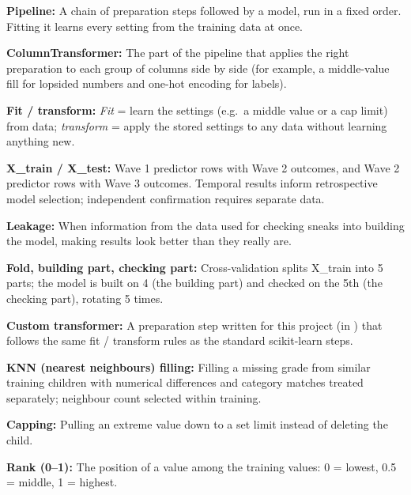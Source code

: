 \documentclass[conference,a4paper]{IEEEtran}
\begin{document}
{\small
\noindent\textbf{Pipeline:} A chain of preparation steps followed by a model, run in a fixed order. Fitting it learns every setting from the training data at once.\par\vspace{2pt}
\noindent\textbf{ColumnTransformer:} The part of the pipeline that applies the right preparation to each group of columns side by side (for example, a middle-value fill for lopsided numbers and one-hot encoding for labels).\par\vspace{2pt}
\noindent\textbf{Fit / transform:} \emph{Fit} = learn the settings (e.g.\ a middle value or a cap limit) from data; \emph{transform} = apply the stored settings to any data without learning anything new.\par\vspace{2pt}
\noindent\textbf{X\_train / X\_test:} Wave 1 predictor rows with Wave 2 outcomes, and Wave 2 predictor rows with Wave 3 outcomes. Temporal results inform retrospective model selection; independent confirmation requires separate data.\par\vspace{2pt}
\noindent\textbf{Leakage:} When information from the data used for checking sneaks into building the model, making results look better than they really are.\par\vspace{2pt}
\noindent\textbf{Fold, building part, checking part:} Cross-validation splits X\_train into 5 parts; the model is built on 4 (the building part) and checked on the 5th (the checking part), rotating 5 times.\par\vspace{2pt}
\noindent\textbf{Custom transformer:} A preparation step written for this project (in ) that follows the same fit / transform rules as the standard scikit-learn steps.\par\vspace{2pt}
\noindent\textbf{KNN (nearest neighbours) filling:} Filling a missing grade from similar training children with numerical differences and category matches treated separately; neighbour count selected within training.\par\vspace{2pt}
\noindent\textbf{Capping:} Pulling an extreme value down to a set limit instead of deleting the child.\par\vspace{2pt}
\noindent\textbf{Rank (0--1):} The position of a value among the training values: 0 = lowest, 0.5 = middle, 1 = highest.\par\vspace{2pt}
}
\end{document}
